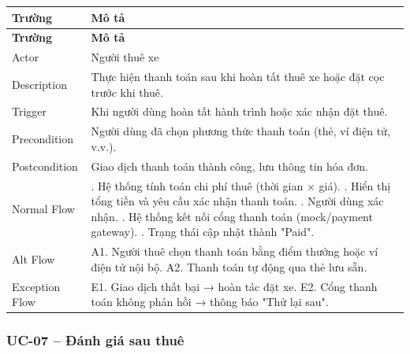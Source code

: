 \begin{longtable}{|>{\raggedright\arraybackslash}p{4cm}|>{\raggedright\arraybackslash}p{11cm}|}
\hline
\textbf{Trường} & \textbf{Mô tả} \\
\hline
\endfirsthead

\hline
\textbf{Trường} & \textbf{Mô tả} \\
\hline
\endhead

\hline
\endfoot

Actor & Người thuê xe \\
\hline
Description & Thực hiện thanh toán sau khi hoàn tất thuê xe hoặc đặt cọc trước khi thuê. \\
\hline
Trigger & Khi người dùng hoàn tất hành trình hoặc xác nhận đặt thuê. \\
\hline
Precondition & Người dùng đã chọn phương thức thanh toán (thẻ, ví điện tử, v.v.). \\
\hline
Postcondition & Giao dịch thanh toán thành công, lưu thông tin hóa đơn. \\
\hline
Normal Flow & 1. Hệ thống tính toán chi phí thuê (thời gian × giá). \newline 2. Hiển thị tổng tiền và yêu cầu xác nhận thanh toán. \newline 3. Người dùng xác nhận. \newline 4. Hệ thống kết nối cổng thanh toán (mock/payment gateway). \newline 5. Trạng thái cập nhật thành "Paid". \\
\hline
Alt Flow & A1. Người thuê chọn thanh toán bằng điểm thưởng hoặc ví điện tử nội bộ. \newline A2. Thanh toán tự động qua thẻ lưu sẵn. \\
\hline
Exception Flow & E1. Giao dịch thất bại → hoàn tác đặt xe. \newline E2. Cổng thanh toán không phản hồi → thông báo "Thử lại sau". \\
\hline
\end{longtable}

\subsubsection*{UC-07 – Đánh giá sau thuê}

